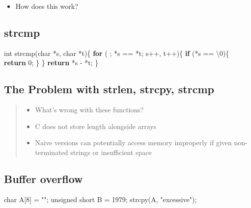 \documentclass[
]{article}
\newenvironment{Shaded}{}{}
\newcommand{\CharTok}[1]{\textcolor[rgb]{0.25,0.44,0.63}{#1}}
\newcommand{\ControlFlowTok}[1]{\textcolor[rgb]{0.00,0.44,0.13}{\textbf{#1}}}
\newcommand{\DataTypeTok}[1]{\textcolor[rgb]{0.56,0.13,0.00}{#1}}
\newcommand{\DecValTok}[1]{\textcolor[rgb]{0.25,0.63,0.44}{#1}}
\newcommand{\NormalTok}[1]{#1}
\newcommand{\StringTok}[1]{\textcolor[rgb]{0.25,0.44,0.63}{#1}}
\providecommand{\tightlist}{%
  \setlength{\itemsep}{0pt}\setlength{\parskip}{0pt}}
\begin{document}
\begin{itemize}
\tightlist
\item
  How does this work?
\end{itemize}

\hypertarget{strcmp}{%
\subsection{strcmp}\label{strcmp}}

\begin{Shaded}
\begin{Highlighting}[]
\DataTypeTok{int}\NormalTok{ strcmp(}\DataTypeTok{char}\NormalTok{ *s, }\DataTypeTok{char}\NormalTok{ *t)\{}
    \ControlFlowTok{for}\NormalTok{ ( ; *s == *t; s++, t++)\{}
        \ControlFlowTok{if}\NormalTok{ (*s == }\CharTok{\textquotesingle{}\textbackslash{}0\textquotesingle{}}\NormalTok{)\{}
            \ControlFlowTok{return} \DecValTok{0}\NormalTok{;}
\NormalTok{        \}}
\NormalTok{    \}}
    \ControlFlowTok{return}\NormalTok{ *s {-} *t;}
\NormalTok{\}}
\end{Highlighting}
\end{Shaded}

\hypertarget{the-problem-with-strlen-strcpy-strcmp}{%
\subsection{The Problem with strlen, strcpy,
strcmp}\label{the-problem-with-strlen-strcpy-strcmp}}

\begin{quote}
\begin{itemize}
\tightlist
\item
  What's wrong with these functions?
\item
  C does not store length alongside arrays
\item
  Naive versions can potentially access memory improperly if given
  non-terminated strings or insufficient space
\end{itemize}
\end{quote}

\hypertarget{buffer-overflow}{%
\subsection{Buffer overflow}\label{buffer-overflow}}

\begin{Shaded}
\begin{Highlighting}[]
\DataTypeTok{char}\NormalTok{           A[}\DecValTok{8}\NormalTok{] = }\StringTok{""}\NormalTok{;}
\DataTypeTok{unsigned} \DataTypeTok{short}\NormalTok{ B    = }\DecValTok{1979}\NormalTok{;}
\NormalTok{strcpy(A, }\StringTok{"excessive"}\NormalTok{);}
\end{Highlighting}
\end{Shaded}
\end{document}
